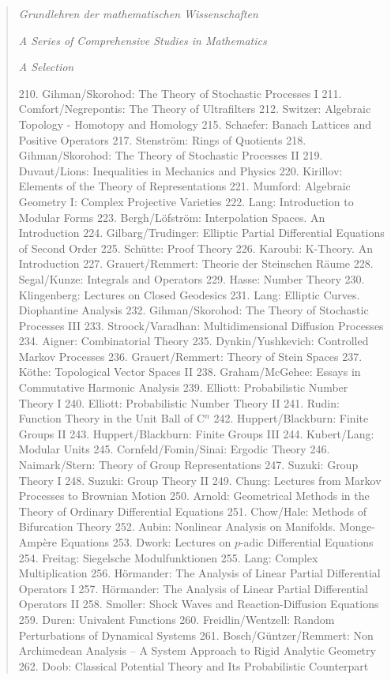 \begin{quote}
\textit{Grundlehren der mathematischen Wissenschaften}

\textit{A Series of Comprehensive Studies in Mathematics}

\textit{A Selection}

210. Gihman/Skorohod: The Theory of Stochastic Processes I
211. Comfort/Negrepontis: The Theory of Ultrafilters
212. Switzer: Algebraic Topology - Homotopy and Homology
215. Schaefer: Banach Lattices and Positive Operators
217. Stenstr\"om: Rings of Quotients
218. Gihman/Skorohod: The Theory of Stochastic Processes II
219. Duvaut/Lions: Inequalities in Mechanics and Physics
220. Kirillov: Elements of the Theory of Representations
221. Mumford: Algebraic Geometry I: Complex Projective Varieties
222. Lang: Introduction to Modular Forms
223. Bergh/L{\"o}fstr{\"o}m: Interpolation Spaces. An Introduction
224. Gilbarg/Trudinger: Elliptic Partial Differential Equations of Second Order
225. Sch{\"u}tte: Proof Theory
226. Karoubi: K-Theory. An Introduction
227. Grauert/Remmert: Theorie der Steinschen R{\"a}ume
228. Segal/Kunze: Integrals and Operators
229. Hasse: Number Theory
230. Klingenberg: Lectures on Closed Geodesics
231. Lang: Elliptic Curves. Diophantine Analysis
232. Gihman/Skorohod: The Theory of Stochastic Processes III
233. Stroock/Varadhan: Multidimensional Diffusion Processes
234. Aigner: Combinatorial Theory
235. Dynkin/Yushkevich: Controlled Markov Processes
236. Grauert/Remmert: Theory of Stein Spaces
237. K\"othe: Topological Vector Spaces II
238. Graham/McGehee: Essays in Commutative Harmonic Analysis
239. Elliott: Probabilistic Number Theory I
240. Elliott: Probabilistic Number Theory II
241. Rudin: Function Theory in the Unit Ball of C$^n$
242. Huppert/Blackburn: Finite Groups II
243. Huppert/Blackburn: Finite Groups III
244. Kubert/Lang: Modular Units
245. Cornfeld/Fomin/Sinai: Ergodic Theory
246. Naimark/Stern: Theory of Group Representations
247. Suzuki: Group Theory I
248. Suzuki: Group Theory II
249. Chung: Lectures from Markov Processes to Brownian Motion
250. Arnold: Geometrical Methods in the Theory of Ordinary Differential Equations
251. Chow/Hale: Methods of Bifurcation Theory
252. Aubin: Nonlinear Analysis on Manifolds. Monge-Amp\`ere Equations
253. Dwork: Lectures on $p$-adic Differential Equations
254. Freitag: Siegelsche Modulfunktionen
255. Lang: Complex Multiplication
256. H\"ormander: The Analysis of Linear Partial Differential Operators I
257. H\"ormander: The Analysis of Linear Partial Differential Operators II
258. Smoller: Shock Waves and Reaction-Diffusion Equations
259. Duren: Univalent Functions
260. Freidlin/Wentzell: Random Perturbations of Dynamical Systems
261. Bosch/G\"untzer/Remmert: Non Archimedean Analysis -- A System Approach
to Rigid Analytic Geometry
262. Doob: Classical Potential Theory and Its Probabilistic Counterpart
\end{quote}

